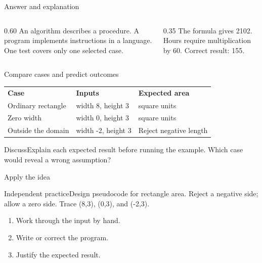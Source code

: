 \documentclass[10pt,aspectratio=169]{beamer}
\begin{document}
\begin{frame}[fragile,t]{Answer and explanation}
\begin{columns}[T,onlytextwidth]\begin{column}{0.60\textwidth}
An algorithm describes a procedure. A program implements instructions in a language. One test covers only one selected case.
\end{column}\begin{column}{0.35\textwidth}\small
The formula gives 2102. Hours require multiplication by 60. Correct result: 155.
\end{column}\end{columns}
\end{frame}


\begin{frame}[fragile,t]{Compare cases and predict outcomes}
\small\renewcommand{\arraystretch}{1.5}
\begin{tabularx}{\textwidth}{>{\raggedright\arraybackslash}X>{\raggedright\arraybackslash}X>{\raggedright\arraybackslash}X}\rowcolor{navy}
\color{white}\bfseries Case & \color{white}\bfseries Inputs & \color{white}\bfseries Expected area\\
Ordinary rectangle & width 8, height 3 & 24 square units\\
Zero width & width 0, height 3 & 0 square units\\
Outside the domain & width -2, height 3 & Reject negative length\\
\end{tabularx}\par\vspace{3mm}\begin{exampleblock}{Discuss}Explain each expected result before running the example. Which case would reveal a wrong assumption?\end{exampleblock}
\end{frame}

\begin{frame}[fragile,t]{Apply the idea}
\begin{alertblock}{Independent practice}Design pseudocode for rectangle area. Reject a negative side; allow a zero side. Trace (8,3), (0,3), and (-2,3).\end{alertblock}\vspace{3mm}\begin{enumerate}\item Work through the input by hand.\item Write or correct the program.\item Justify the expected result.\end{enumerate}
\end{frame}
\end{document}
